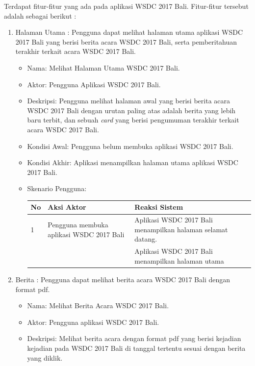 Terdapat fitur-fitur yang ada pada aplikasi WSDC 2017 Bali. Fitur-fitur tersebut adalah sebagai berikut :
\begin{enumerate}
	\item Halaman Utama : Pengguna dapat melihat halaman utama aplikasi WSDC 2017 Bali yang berisi berita acara WSDC 2017 Bali, serta pemberitahuan terakhir terkait acara WSDC 2017 Bali.
	\begin{itemize}
		\item Nama: Melihat Halaman Utama WSDC 2017 Bali.
		\item Aktor: Pengguna Aplikasi WSDC 2017 Bali.
		\item Deskripsi: Pengguna melihat halaman awal yang berisi berita acara WSDC 2017 Bali dengan urutan paling atas adalah berita yang lebih baru terbit, dan sebuah {\it card} yang berisi pengumuman terakhir terkait acara WSDC 2017 Bali.
		\item Kondisi Awal: Pengguna belum membuka aplikasi WSDC 2017 Bali.
		\item Kondisi Akhir: Aplikasi menampilkan halaman utama aplikasi WSDC 2017 Bali.
		\item Skenario Pengguna:\\
		\begin{table}[H]
			\centering
			\begin{tabular}{|p{0.5cm}|p{7cm}|p{7cm}|}
				\hline
				No & Aksi Aktor                               & Reaksi Sistem                                          \\ \hline
				1  & Pengguna membuka aplikasi WSDC 2017 Bali & Aplikasi WSDC 2017 Bali menampilkan halaman selamat datang. \\ \hline
				   &                                          & Aplikasi WSDC 2017 Bali menampilkan halaman utama           \\ \hline
			\end{tabular}
		\end{table}
	\end{itemize}
	\item Berita : Pengguna dapat melihat berita acara WSDC 2017 Bali dengan format pdf.
	\begin{itemize}
		\item Nama: Melihat Berita Acara WSDC 2017 Bali.
		\item Aktor: Pengguna aplikasi WSDC 2017 Bali.
		\item Deskripsi: Melihat berita acara dengan format pdf yang berisi kejadian kejadian pada WSDC 2017 Bali di tanggal tertentu sesuai dengan berita yang diklik.

\end{itemize}
\end{enumerate}
